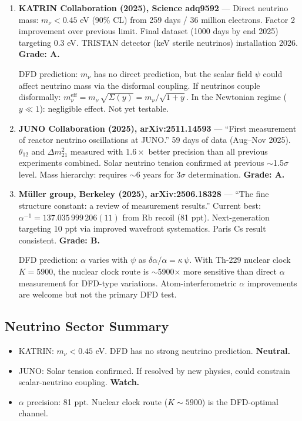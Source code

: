 \documentclass[11pt,a4paper]{article}
\begin{document}
\begin{enumerate}

\item \textbf{KATRIN Collaboration (2025), Science adq9592} --- Direct neutrino mass: $m_\nu < 0.45$ eV (90\% CL) from 259 days / 36 million electrons. Factor 2 improvement over previous limit. Final dataset (1000 days by end 2025) targeting 0.3 eV. TRISTAN detector (keV sterile neutrinos) installation 2026. \textbf{Grade: A.}

DFD prediction: $m_\nu$ has no direct prediction, but the scalar field $\psi$ could affect neutrino mass via the disformal coupling. If neutrinos couple disformally: $m_\nu^\mathrm{eff} = m_\nu\,\sqrt{\Sigma(y)} = m_\nu/\sqrt{1+y}$. In the Newtonian regime ($y \ll 1$): negligible effect. Not yet testable.

\item \textbf{JUNO Collaboration (2025), arXiv:2511.14593} --- ``First measurement of reactor neutrino oscillations at JUNO.'' 59 days of data (Aug--Nov 2025). $\theta_{12}$ and $\Delta m^2_{21}$ measured with $1.6\times$ better precision than all previous experiments combined. Solar neutrino tension confirmed at previous $\sim$1.5$\sigma$ level. Mass hierarchy: requires $\sim$6 years for 3$\sigma$ determination. \textbf{Grade: A.}

\item \textbf{M\"uller group, Berkeley (2025), arXiv:2506.18328} --- ``The fine structure constant: a review of measurement results.'' Current best: $\alpha^{-1} = 137.035\,999\,206(11)$ from Rb recoil (81 ppt). Next-generation targeting 10 ppt via improved wavefront systematics. Paris Cs result consistent. \textbf{Grade: B.}

DFD prediction: $\alpha$ varies with $\psi$ as $\delta\alpha/\alpha = \kappa\,\psi$. With Th-229 nuclear clock $K = 5900$, the nuclear clock route is $\sim$5900$\times$ more sensitive than direct $\alpha$ measurement for DFD-type variations. Atom-interferometric $\alpha$ improvements are welcome but not the primary DFD test.

\end{enumerate}

\subsection{Neutrino Sector Summary}
\begin{itemize}
\item KATRIN: $m_\nu < 0.45$ eV. DFD has no strong neutrino prediction. \textbf{Neutral.}
\item JUNO: Solar tension confirmed. If resolved by new physics, could constrain scalar-neutrino coupling. \textbf{Watch.}
\item $\alpha$ precision: 81 ppt. Nuclear clock route ($K \sim 5900$) is the DFD-optimal channel.
\end{itemize}
\end{document}
